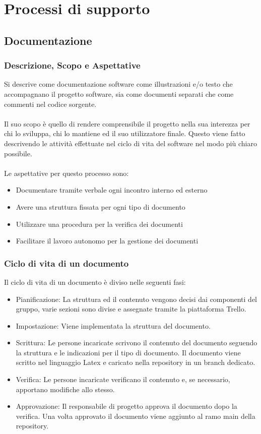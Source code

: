 \documentclass{article}
\begin{document}
\section{Processi di supporto}

\subsection{Documentazione}
\subsubsection{Descrizione, Scopo e Aspettative }
Si descrive come documentazione software come illustrazioni e/o testo che accompagnano il progetto software, sia come documenti separati che come commenti nel codice sorgente.\\ \\
Il suo scopo è quello di rendere comprensibile il progetto nella sua interezza per chi lo sviluppa, chi lo mantiene ed il suo utilizzatore finale. Questo viene fatto descrivendo le attività effettuate nel ciclo di vita del software nel modo più chiaro possibile.\\ \\
Le aspettative per questo processo sono:
\begin{itemize}
    \item Documentare tramite verbale ogni incontro interno ed esterno
    \item Avere una struttura fissata per ogni tipo di documento
    \item Utilizzare una procedura per la verifica dei documenti
    \item Facilitare il lavoro autonomo per la gestione dei documenti
\end{itemize}

\subsubsection{Ciclo di vita di un documento} \label{cicloDoc}
Il ciclo di vita di un documento è diviso nelle seguenti fasi:
\begin{itemize}
    \item Pianificazione: La struttura ed il contenuto vengono decisi dai componenti del gruppo, varie sezioni sono divise e assegnate tramite la piattaforma Trello.
    \item Impostazione: Viene implementata la struttura del documento.
    \item Scrittura: Le persone incaricate scrivono il contenuto del documento seguendo la struttura e le indicazioni per il tipo di documento. Il documento viene scritto nel linguaggio Latex e caricato nella repository in un branch dedicato.
    \item Verifica: Le persone incaricate verificano il contenuto e, se necessario, apportano modifiche allo stesso.
    \item Approvazione: Il responsabile di progetto approva il documento dopo la verifica. Una volta approvato il documento viene aggiunto al ramo main della repository.
\end{itemize}
\end{document}
